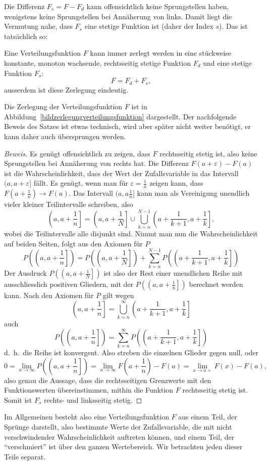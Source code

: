 Die Differenz $F_s=F-F_d$ kann offensichtlich keine Sprungstellen haben,
wenigstens keine Sprungstellen bei Annäherung von links.
Damit liegt
die Vermutung nahe, dass $F_s$ eine stetige Funktion ist (daher der Index
$s$).
Das ist tatsächlich so:
\begin{satz}Eine Verteilungsfunktion $F$ kann immer zerlegt werden in eine
stückweise konstante, monoton wachsende, rechtsseitig stetige Funktion
$F_d$ und eine stetige Funktion $F_s$:
\[
F=F_d+F_s,
\]
ausserdem ist diese Zerlegung eindeutig.
\end{satz}
Die Zerlegung der Verteilungsfunktion $F$ ist in
Abbildung~\ref{bildzerlegungverteilungsfunktion} dargestellt.
Der nachfolgende Beweis des Satzes ist etwas technisch, wird aber später nicht
weiter benötigt, er kann daher auch übersprungen werden.
{\small
\begin{proof}[Beweis]
Es genügt offensichtlich zu zeigen, dass $F$ rechtsseitig stetig ist, also
keine Sprungstellen bei Annäherung von rechts hat.
Die Differenz
$F(a+\varepsilon)-F(a)$ ist die Wahrscheinlichkeit, dass der Wert der
Zufallsvariable in das Intervall $(a,a+\varepsilon]$
fällt.
Es genügt, wenn man für $\varepsilon=\frac1n$ zeigen kann,
dass $F(a+\frac1n)\to F(a)$.
Das Intervall $(a,a\frac1n]$ kann man
als Vereinigung unendlich vieler kleiner Teilintervalle
schreiben, also
\[
\left(a,{\textstyle a+\frac1n}\right]
= \left(a,a+{\textstyle \frac1N}\right]\cup
\bigcup_{k=n}^{N-1}\left(a+{\textstyle\frac1{k+1}},a+{\textstyle\frac1k}\right],
\]
wobei die Teilintervalle alle disjunkt sind.
Nimmt man nun die Wahrscheinlichkeit auf beiden Seiten, folgt aus den
Axiomen für $P$
\[
P\left(\left(a,a+{\textstyle\frac1n}\right]\right)
= P\left(\left(a,a+{\textstyle \frac1N}\right]\right)+
\sum_{k=n}^{N-1}P\left(\left(a+{\textstyle\frac1{k+1}},a+{\textstyle\frac1k}\right]\right)
\]
Der Ausdruck $P\left(\left(a,a+{\frac1N}\right]\right)$ ist also der
Rest einer unendlichen Reihe mit ausschliesslich positiven Gliedern,
mit der $P\left(\left(a,a+{\textstyle\frac1n}\right]\right)$
berechnet werden kann.
 Nach den Axiomen für $P$ gilt wegen
\[
\left(a,{\textstyle a+\frac1n}\right]
= 
\bigcup_{k=n}^{\infty}
\left(a+{\textstyle\frac1{k+1}},a+{\textstyle\frac1k}\right]
\]
auch
\[
P\left(\left(a,{\textstyle a+\frac1n}\right]\right)
= 
\sum_{k=n}^{\infty}
P\left(\left(a+{\textstyle\frac1{k+1}},a+{\textstyle\frac1k}\right]\right)
\]
d.~h.~die Reihe ist konvergent.
Also streben die einzelnen Glieder gegen null,
oder
\[
0=\lim_{n\to\infty}P\left(\left(a,{\textstyle a+\frac1n}\right]\right)
=\lim_{n\to\infty}F(a+{\textstyle\frac1n}) - F(a)=\lim_{x\to a+} F(x)-F(a),
\]
also genau die Aussage, dass die rechtsseitigen Grenzwerte mit den
Funktionswerten übereinstimmen, mithin die Funktion $F$ rechtsseitig
stetig ist.
Somit ist $F_s$ rechts- und linksseitig stetig.
\end{proof}
}
Im Allgemeinen besteht also eine Verteilungsfunktion $F$ aus einem
Teil, der Sprünge darstellt, also bestimmte Werte der Zufallsvariable,
die mit nicht verschwindender Wahrscheinlichkeit auftreten können, und
einem Teil, der ``verschmiert'' ist über den ganzen Wertebereich.
Wir
betrachten jeden dieser Teile separat.

